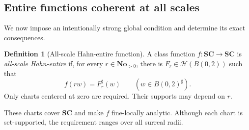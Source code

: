 \documentclass[11pt,letterpaper]{article}
\theoremstyle{definition}
\newtheorem{definition}[theorem]{Definition}
\theoremstyle{remark}
\newcommand{\No}{\mathbf{No}}
\newcommand{\SC}{\mathbf{SC}}
\newcommand{\HH}{\mathcal H}
\newcommand{\sh}{^{\sharp}}
\numberwithin{equation}{section}
\begin{document}
\subsection{Entire functions coherent at all scales}
We now impose an intentionally strong global condition and determine its exact consequences.

\begin{definition}[All-scale Hahn-entire function]\label{def:allscale}
A class function $f:\SC\to\SC$ is \emph{all-scale Hahn-entire} if, for every $r\in\No_{>0}$, there is $F_r\in\HH(B(0,2))$ such that
\[
 f(rw)=F_r\sh(w)\qquad(w\in B(0,2)\sh).
\]
Only charts centered at zero are required. Their supports may depend on $r$.
\end{definition}
These charts cover $\SC$ and make $f$ fine-locally analytic. Although each chart is set-supported, the requirement ranges over all surreal radii.
\end{document}
